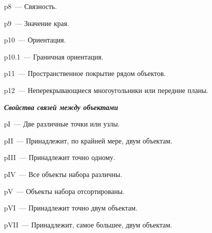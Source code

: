      p8~---  Связность. 


    


 p9~---  Значение края. 


    


 p10~---  Ориентация. 





 p10.1~--- Граничная ориентация. 





 p11~--- Пространственное покрытие рядом объектов. 





 p12~--- Неперекрывающиеся многоугольники или передние планы. 














\smallskip


{\bfseries\textit{Свойства связей между объектами }}





\smallskip





     pI~---  Две различные точки или узлы. 





     pII~---  Принадлежит, по крайней мере, двум объектам. 





 pIII~--- Принадлежит точно одному. 





 pIV~--- Все объекты набора различны. 





     pV~---  Объекты набора отсортированы. 





 pVI~---  Принадлежит точно двум объектам. 





 pVII~---    Принадлежит, самое большее, двум объектам. 





